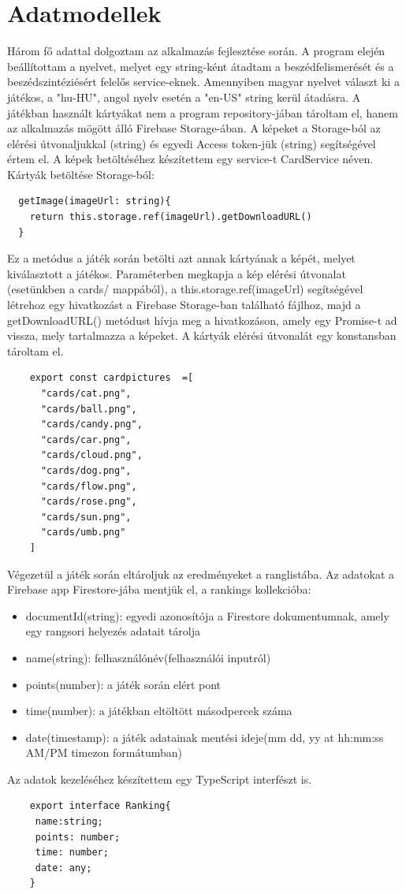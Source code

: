 \documentclass[12pt]{report}
\begin{document}
\section{Adatmodellek}
Három fő adattal dolgoztam az alkalmazás fejlesztése során. A program elején beállítottam a nyelvet, melyet egy string-ként átadtam a beszédfelismerését és a beszédszintéziésért felelős service-eknek. Amennyiben magyar nyelvet választ ki a játékos, a "hu-HU", angol nyelv esetén a "en-US" string kerül átadásra. A játékban használt kártyákat nem a program repository-jában tároltam el, hanem az alkalmazás mögött álló Firebase Storage-ában. A képeket a Storage-ból az elérési útvonaljukkal (string) és egyedi Access token-jük (string) segítségével értem el. A képek betöltéséhez készítettem egy service-t CardService néven.
\newline
\newline
Kártyák betöltése Storage-ból:
\begin{verbatim}
  getImage(imageUrl: string){
    return this.storage.ref(imageUrl).getDownloadURL()
  }
\end{verbatim}
\newline
Ez a metódus a játék során betölti azt annak kártyának a képét, melyet kiválasztott a játékos. Paraméterben megkapja a kép elérési útvonalat (esetünkben a cards/ mappából), a this.storage.ref(imageUrl) segítségével létrehoz egy hivatkozást a Firebase Storage-ban található fájlhoz, majd a getDownloadURL() metódust hívja meg a hivatkozáson, amely egy Promise-t ad vissza, mely tartalmazza a képeket.
\pagebreak
A kártyák elérési útvonalát egy konstansban tároltam el.
\begin{verbatim}
    export const cardpictures  =[
      "cards/cat.png",
      "cards/ball.png",
      "cards/candy.png",
      "cards/car.png",
      "cards/cloud.png",
      "cards/dog.png",
      "cards/flow.png",
      "cards/rose.png",
      "cards/sun.png",
      "cards/umb.png"
    ]
\end{verbatim}

Végezetül a játék során eltároljuk az eredményeket a ranglistába. Az adatokat a Firebase app Firestore-jába mentjük el, a rankings kollekcióba:
\begin{itemize}
    \item documentId(string): egyedi azonosítója a Firestore dokumentumnak, amely egy rangsori helyezés adatait tárolja
    \item name(string): felhasználónév(felhasználói inputról)
    \item points(number): a játék során elért pont
    \item time(number): a játékban eltöltött másodpercek száma
    \item date(timestamp): a játék adatainak mentési ideje(mm dd, yy at hh:mm:ss AM/PM timezon formátumban)
\end{itemize}
Az adatok kezeléséhez készítettem egy TypeScript interfészt is.
\begin{verbatim}
    export interface Ranking{
     name:string;
     points: number;
     time: number;
     date: any;
    }
\end{verbatim}
\end{document}
